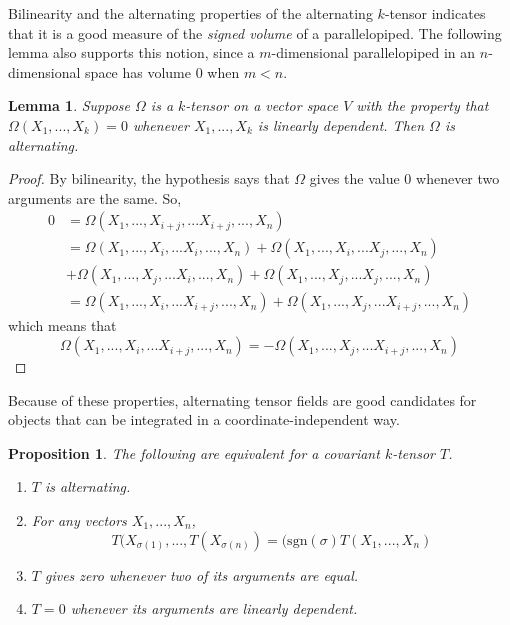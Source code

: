 \documentclass{article}
\newtheorem{proposition}[theorem]{Proposition}
\newtheorem{lemma}[theorem]{Lemma}
\theoremstyle{remark}
\theoremstyle{definition}
\begin{document}
    Bilinearity and the alternating properties of the alternating $k$-tensor indicates that it is a good measure of the \textit{signed volume} of a parallelopiped. The following lemma also supports this notion, since a $m$-dimensional parallelopiped in an $n$-dimensional space has volume $0$ when $m < n$. 

    \begin{lemma}
    Suppose $\Omega$ is a $k$-tensor on a vector space $V$ with the property that $\Omega(X_1, ..., X_k) = 0$ whenever $X_1, ..., X_k$ is linearly dependent. Then $\Omega$ is alternating.
    \end{lemma}
    \begin{proof}
    By bilinearity, the hypothesis says that $\Omega$ gives the value $0$ whenever two arguments are the same. So, 
    \begin{align*}
        0 & = \Omega(X_1, ..., X_{i+j}, ... X_{i+j}, ..., X_n)  \\
        & = \Omega(X_1, ..., X_{i}, ... X_{i}, ..., X_n) + \Omega(X_1, ..., X_{i}, ... X_{j}, ..., X_n) \\
        & + \Omega(X_1, ..., X_{j}, ... X_{i}, ..., X_n) + \Omega(X_1, ..., X_{j}, ... X_{j}, ..., X_n) \\
        & = \Omega(X_1, ..., X_{i}, ... X_{i+j}, ..., X_n) + \Omega(X_1, ..., X_{j}, ... X_{i+j}, ..., X_n)
    \end{align*}
    which means that 
    \[\Omega(X_1, ..., X_{i}, ... X_{i+j}, ..., X_n) = - \Omega(X_1, ..., X_{j}, ... X_{i+j}, ..., X_n)\]
    \end{proof}

    Because of these properties, alternating tensor fields are good candidates for objects that can be integrated in a coordinate-independent way. 

    \begin{proposition}
    The following are equivalent for a covariant $k$-tensor $T$. 
    \begin{enumerate}
        \item $T$ is alternating. 
        \item For any vectors $X_1, ..., X_n$, 
        \[T(X_{\sigma(1)}, ..., T(X_{\sigma(n)}) = (\text{sgn}(\sigma) T(X_1, ..., X_n)\]
        \item $T$ gives zero whenever two of its arguments are equal. 
        \item $T = 0$ whenever its arguments are linearly dependent.
    \end{enumerate}
    \end{proposition}
\end{document}
